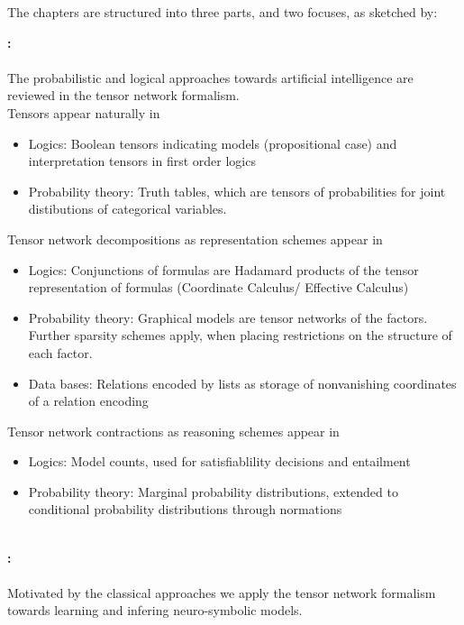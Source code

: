 
The chapters are structured into three parts, and two focuses, as sketched by:


\textbf{: \partonetext} \\
\ \\
The probabilistic and logical approaches towards artificial intelligence are reviewed in the tensor network formalism. \\

Tensors appear naturally in
\begin{itemize}
    \item Logics: Boolean tensors indicating models (propositional case) and interpretation tensors in first order logics
    \item Probability theory: Truth tables, which are tensors of probabilities for joint distibutions of categorical variables.
\end{itemize}

Tensor network decompositions as representation schemes appear in
\begin{itemize}
    \item Logics: Conjunctions of formulas are Hadamard products of the tensor representation of formulas (Coordinate Calculus/ Effective Calculus)
    \item Probability theory: Graphical models are tensor networks of the factors. Further sparsity schemes apply, when placing restrictions on the structure of each factor.
    \item Data bases: Relations encoded by lists as storage of nonvanishing coordinates of a relation encoding
\end{itemize}

Tensor network contractions as reasoning schemes appear in
\begin{itemize}
    \item Logics: Model counts, used for satisfiablility decisions and entailment
    \item Probability theory: Marginal probability distributions, extended to conditional probability distributions through normations
\end{itemize}

\ \\
\textbf{: \parttwotext} \\
\ \\
Motivated by the classical approaches we apply the tensor network formalism towards learning and infering neuro-symbolic models. \\


